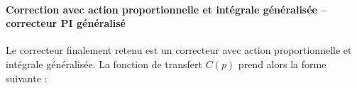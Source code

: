 %
%
%


\ifprof
\else
\paragraph{Correction avec action proportionnelle et intégrale généralisée -- correcteur PI généralisé}


Le correcteur finalement retenu est un correcteur avec action proportionnelle et intégrale généralisée. La fonction de transfert $C(p)$ prend alors la forme suivante :

